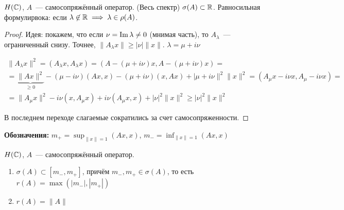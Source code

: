 \begin{theorem}[11.4]\label{11.4}
    $H(\mathbb{C})$, $A$~--- самосопряжённый оператор.
    (Весь спектр) $\sigma(A) \subset \mathbb{R}$.
    Равносильная формулирвока: если $\lambda \not\in \mathbb{R} \implies \lambda \in \rho(A)$.
\end{theorem}

\begin{proof}
Идея: покажем, что если $\nu = \operatorname{Im} \lambda \neq 0$ (мнимая часть), то $A_{\lambda}$~--- ограниченный снизу. Точнее, $\| A_\lambda x \| \geqslant |\nu| \| x \|$. $\lambda = \mu + i \nu$

\begin{multline*}
\|A_{\lambda} x\|^2 = (A_{\lambda} x, A_{\lambda} x) = 
(A - (\mu + i \nu) x, A - (\mu + i \nu) x) = \\
= \underbrace{\|A x\|^2}_{\geqslant 0} - 
(\mu - i \nu) (A x, x) - (\mu + i \nu) (x, Ax) +
|\mu + i \nu\|^2 \|x\|^2
= (A_{\mu} x - i \nu x, A_{\mu} - i \nu x) = \\
= \|A_{\mu} x\|^2 - i \nu (x, A_{\mu} x) + i \nu (A_{\mu}x, x) +
|\nu|^2 \|x\|^2 \geqslant |\nu|^2 \|x\|^2
\end{multline*}

В последнем переходе слагаемые сократились за счет самосопряженности.

\end{proof}

\textbf{Обозначения:} $m_+=\sup_{\|x\|=1} (Ax, x)$, $m_-=\inf_{\|x\|=1} (Ax, x)$
\begin{theorem}[11.5]\label{11.5}
    $H(\mathbb{C})$, $A$~--- самосопряжённый оператор.
   \begin{enumerate}
        \item $\sigma(A) \subset [m_-, m_+]$, 
        причём $m_-, m_+ \in \sigma(A)$, то есть
        $r(A) = \max(|m_-|, |m_+|)$
        \item $r(A)=\|A\|$
    \end{enumerate}
\end{theorem}


